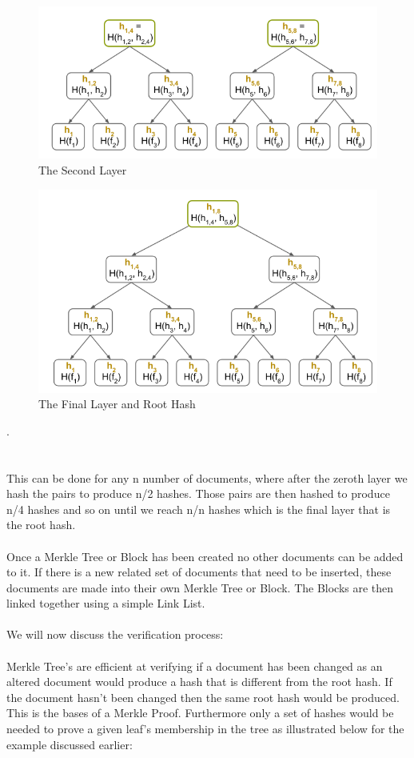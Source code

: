 \documentclass{article}
\begin{document}
\begin{figure}[htp]
    \centering
    \includegraphics[width=12cm]{Layer 2}
    \caption{The Second Layer}
    \label{fig:f3}
\end{figure}

\begin{figure}[htp]
    \centering
    \includegraphics[width=12cm]{Final Layer}
    \caption{The Final Layer and Root Hash}
    \label{fig:f4}
\end{figure}

.
\\\\\\
This can be done for any n number of documents, where after the zeroth layer we hash the pairs to produce n/2 hashes. Those pairs are then hashed to produce n/4 hashes and so on until we reach n/n hashes which is the final layer that is the root hash.
\\\\
Once a Merkle Tree or Block has been created no other documents can be added to it. If there is a new related set of documents that need to be inserted, these documents are made into their own Merkle Tree or Block. The Blocks are then linked together using a simple Link List.
\\\\
We will now discuss the verification process:
\\\\
Merkle Tree's are efficient at verifying if a document has been changed as an altered document would produce a hash that is different from the root hash. If the document hasn't been changed then the same root hash would be produced. This is the bases of a Merkle Proof. Furthermore only a set of hashes would be needed to prove a given leaf's membership in the tree as illustrated below for the example discussed earlier:
\end{document}
